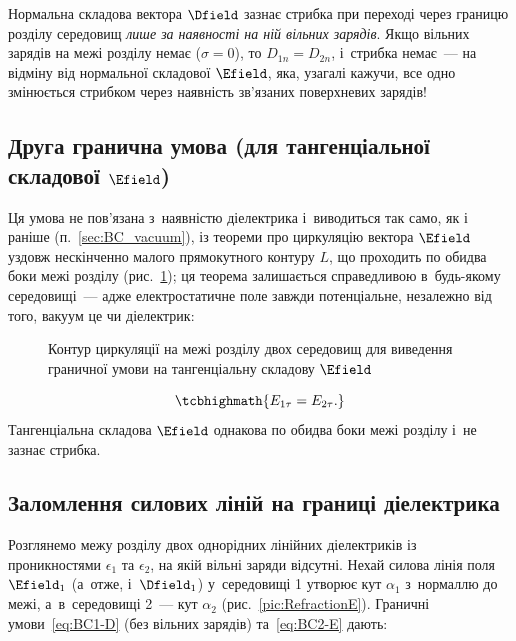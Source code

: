 \begin{Attention}
	Нормальна складова вектора $\Dfield$ зазнає стрибка при переході через границю розділу
	середовищ \emph{лише за наявності на ній вільних зарядів}. Якщо вільних зарядів на
	межі розділу немає ($\sigma = 0$), то $D_{1n} = D_{2n}$, і~стрибка немає~--- на
	відміну від нормальної складової $\Efield$, яка, узагалі кажучи, все одно змінюється
	стрибком через наявність зв'язаних поверхневих зарядів!
\end{Attention}


\subsection*{Друга гранична умова (для тангенціальної складової $\Efield$)}


Ця умова не пов'язана з~наявністю діелектрика і~виводиться так само, як і раніше
(п.~\ref{sec:BC_vacuum}), із теореми про циркуляцію вектора $\Efield$ уздовж нескінченно
малого прямокутного контуру $L$, що проходить по обидва боки межі розділу
(рис.~\ref{pic:BC2}); ця теорема залишається справедливою в~будь-якому середовищі~--- адже
електростатичне поле завжди потенціальне, незалежно від того, вакуум це чи діелектрик:

\begin{figure}\centering
	\caption{Контур циркуляції на межі розділу двох середовищ для виведення граничної
		умови на тангенціальну складову $\Efield$\label{pic:BC2}}
\end{figure}
\begin{equation}\label{eq:BC2-E}
	\tcbhighmath{
		E_{1\tau} = E_{2\tau}.
	}
\end{equation}
Тангенціальна складова $\Efield$ однакова по обидва боки межі розділу і~не зазнає стрибка.


\subsection*{Заломлення силових ліній на границі діелектрика}


Розглянемо межу розділу двох однорідних лінійних діелектриків із проникностями
$\epsilon_1$ та $\epsilon_2$, на якій вільні заряди відсутні. Нехай силова лінія поля
$\Efield_1$ (а~отже, і~$\Dfield_1$) у~середовищі 1 утворює кут $\alpha_1$ з~нормаллю до
межі, а~в~середовищі 2~--- кут $\alpha_2$ (рис.~\ref{pic:RefractionE}). Граничні
умови~\eqref{eq:BC1-D} (без вільних зарядів) та~\eqref{eq:BC2-E} дають:

